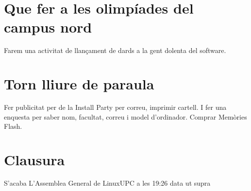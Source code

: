 \documentclass{article}
\begin{document}
\section{Que fer a les olimpíades del campus nord}
Farem una activitat de llançament de dards a la gent dolenta del software.

\section{Torn lliure de paraula}
Fer publicitat per de la Install Party per correu, imprimir cartell. I fer una enquesta per saber nom, facultat, correu i model d'ordinador. Comprar Memòries Flash.

\section{Clausura}
S'acaba L'Assemblea General de LinuxUPC a les 19:26 data ut supra
\end{document}
